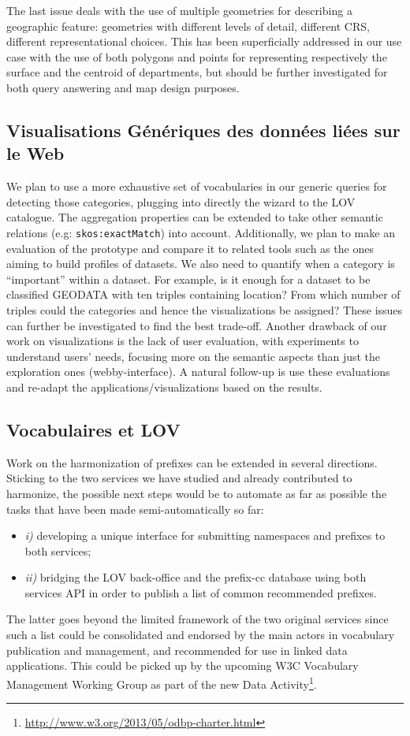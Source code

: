 \documentclass[a4paper,11pt,twoside]{report}
\begin{document}
The last issue deals with the use of multiple geometries for describing a geographic feature: geometries with different levels of detail, different CRS, different representational choices. This has been superficially addressed in our use case with the use of both polygons and points for representing respectively the surface and the centroid of departments, but should be further investigated for both query answering and map design purposes.


\subsection*{ Visualisations Génériques des données liées sur le Web}
We plan to use a more exhaustive set of vocabularies in our generic queries for detecting those categories, plugging into directly the wizard to the LOV catalogue. The aggregation properties can be extended to take other semantic relations (e.g: \texttt{skos:exactMatch}) into account. Additionally, we plan to make an evaluation of the prototype and compare it to related tools such as the ones aiming to build profiles of datasets. We also need to quantify when a category is ``important'' within a dataset. For example, is it enough for a dataset to be classified GEODATA with ten triples containing location? From which number of triples could the categories and hence the visualizations be assigned? These issues can further be investigated to find the best trade-off.  Another drawback of our work on visualizations is the lack of user evaluation, with experiments to understand users' needs, focusing more on the semantic aspects than just the exploration ones (webby-interface). A natural follow-up is use these evaluations and re-adapt the applications/visualizations based on the results. 
 
\subsection*{Vocabulaires et LOV}
\label{sec:nextSteps}
Work on the harmonization of prefixes can be extended in several directions. Sticking to the two services we have studied and already contributed to harmonize, the possible next steps would be to automate as far as possible the tasks that have been made semi-automatically so far:
\begin{itemize}
\item \emph{i)} developing a unique interface for submitting namespaces and prefixes to both services;
\item \emph{ii)} bridging the LOV back-office and the prefix-cc database using both services API in order to publish a list of common recommended prefixes. 
\end{itemize}  The latter goes beyond the limited framework of the two original services since such a list could be consolidated and endorsed by the main actors in vocabulary publication and management, and recommended for use in linked data applications. This could be picked up by the upcoming W3C Vocabulary Management Working Group as part of the new Data Activity\footnote{\url{http://www.w3.org/2013/05/odbp-charter.html}}.
\end{document}
